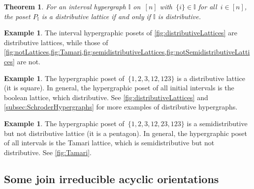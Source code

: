 \documentclass{amsart}
\newtheorem{theoremA}{Theorem}
\theoremstyle{definition}
\newtheorem{example}[theorem]{Example}
\newcommand{\II}{\mathbb I} %
\begin{document}
\begin{theoremA}
For an interval hypergraph $\II$ on~$[n]$ with~$\{i\} \in \II$ for all~$i \in [n]$, the poset $P_\II$ is a distributive lattice if and only if $\II$ is distributive.
\end{theoremA}

\begin{example}
The interval hypergraphic posets of \cref{fig:distributiveLattices} are distributive lattices, while those of \cref{fig:notLattices,fig:Tamari,fig:semidistributiveLattices,fig:notSemidistributiveLattices} are not.
\end{example}

\begin{example}
The hypergraphic poset of~$\{ 1, 2, 3, 12, 123\}$ is a distributive lattice (it is square).
In general, the hypergraphic poset of all initial intervals is the boolean lattice, which distributive.
See \cref{fig:distributiveLattices} and \cref{subsec:SchroderHypergraphs} for more examples of distributive hypergraphs.
\end{example}

\begin{example}
The hypergraphic poset of~$\{ 1, 2, 3, 12, 23, 123 \}$ is a semidistributive but not distributive lattice (it is a pentagon).
In general, the hypergraphic poset of all intervals is the Tamari lattice, which is semidistributive but not distributive.
See \cref{fig:Tamari}.
\end{example}


\subsection{Some join irreducible acyclic orientations}  
\label{subsec:someJoinIrreducibles}
\end{document}

